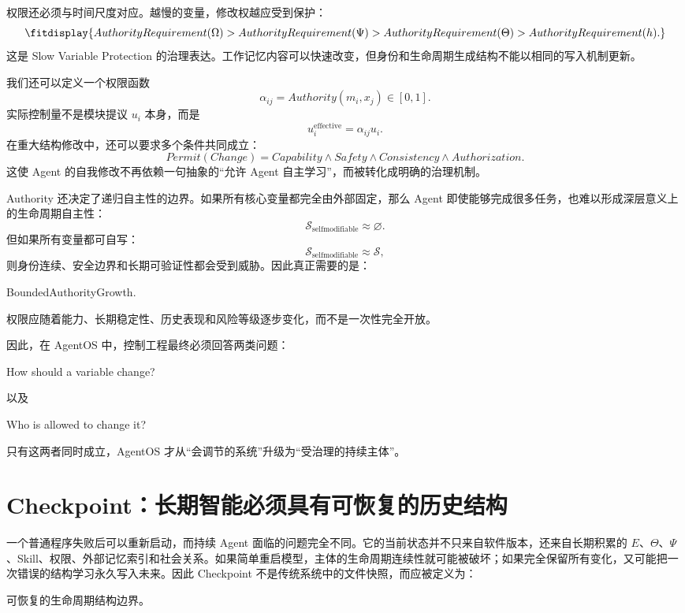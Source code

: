 权限还必须与时间尺度对应。越慢的变量，修改权越应受到保护：
\[
\fitdisplay{
AuthorityRequirement(\Omega)
>
AuthorityRequirement(\Psi)
>
AuthorityRequirement(\Theta)
>
AuthorityRequirement(h).
}
\]
这是 Slow Variable Protection 的治理表达。工作记忆内容可以快速改变，但身份和生命周期生成结构不能以相同的写入机制更新。

我们还可以定义一个权限函数
\[
\alpha_{ij}
=
Authority(m_i,x_j)\in[0,1].
\]
实际控制量不是模块提议 $u_i$ 本身，而是
\[
u_i^{\mathrm{effective}}
=
\alpha_{ij}
u_i.
\]
在重大结构修改中，还可以要求多个条件共同成立：
\[
Permit(Change)
=
Capability
\land
Safety
\land
Consistency
\land
Authorization.
\]
这使 Agent 的自我修改不再依赖一句抽象的``允许 Agent 自主学习''，而被转化成明确的治理机制。

Authority 还决定了递归自主性的边界。如果所有核心变量都完全由外部固定，那么 Agent 即使能够完成很多任务，也难以形成深层意义上的生命周期自主性：
\[
\mathcal S_{\mathrm{selfmodifiable}}
\approx\varnothing.
\]
但如果所有变量都可自写：
\[
\mathcal S_{\mathrm{selfmodifiable}}
\approx\mathcal S,
\]
则身份连续、安全边界和长期可验证性都会受到威胁。因此真正需要的是：
\begin{statementbox}
BoundedAuthorityGrowth.
\end{statementbox}
权限应随着能力、长期稳定性、历史表现和风险等级逐步变化，而不是一次性完全开放。

因此，在 AgentOS 中，控制工程最终必须回答两类问题：
\begin{statementbox}
How should a variable change?
\end{statementbox}
以及
\begin{statementbox}
Who is allowed to change it?
\end{statementbox}
只有这两者同时成立，AgentOS 才从``会调节的系统''升级为``受治理的持续主体''。

\section{Checkpoint：长期智能必须具有可恢复的历史结构}

一个普通程序失败后可以重新启动，而持续 Agent 面临的问题完全不同。它的当前状态并不只来自软件版本，还来自长期积累的 $E$、$\Theta$、$\Psi$、Skill、权限、外部记忆索引和社会关系。如果简单重启模型，主体的生命周期连续性就可能被破坏；如果完全保留所有变化，又可能把一次错误的结构学习永久写入未来。因此 Checkpoint 不是传统系统中的文件快照，而应被定义为：
\begin{definition*}
可恢复的生命周期结构边界。
\end{definition*}

